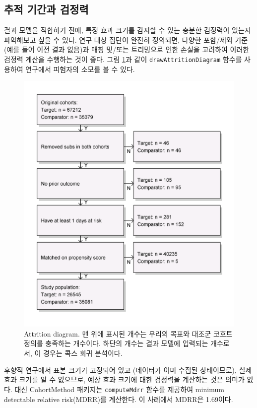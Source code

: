 \documentclass[10.5pt]{book}
\theoremstyle{definition}
\theoremstyle{definition}
\theoremstyle{definition}
\theoremstyle{remark}
\begin{document}
\subsection{추적 기간과 검정력}\label{--}

결과 모델을 적합하기 전에, 특정 효과 크기를 감지할 수 있는 충분한
검정력이 있는지 파악해보고 싶을 수 있다. 연구 대상 집단이 완전히
정의되면, 다양한 포함/제외 기준 (예를 들어 이전 결과 없음)과 매칭
및/또는 트리밍으로 인한 손실을 고려하여 이러한 검정력 계산을 수행하는
것이 좋다. 그림 \ref{fig:attrition}과 같이 \texttt{drawAttritionDiagram}
함수를 사용하여 연구에서 피험자의 소모를 볼 수 있다.

\begin{figure}

{\centering \includegraphics[width=0.7\linewidth]{images/PopulationLevelEstimation/attrition} 

}

\caption{Attrition diagram. 맨 위에 표시된 개수는 우리의 목표와 대조군 코호트 정의를 충족하는 개수이다. 하단의 개수는 결과 모델에 입력되는 개수로서, 이 경우는 콕스 회귀 분석이다.}\label{fig:attrition}
\end{figure}

후향적 연구에서 표본 크기가 고정되어 있고 (데이터가 이미 수집된
상태이므로), 실제 효과 크기를 알 수 없으므로, 예상 효과 크기에 대한
검정력을 계산하는 것은 의미가 없다. 대신 CohortMethod 패키지는
\texttt{computeMdrr} 함수를 제공하여 minimum detectable relative
risk(MDRR)를 계산한다. 이 사례에서 MDRR은 1.69이다.
 
\end{document}
